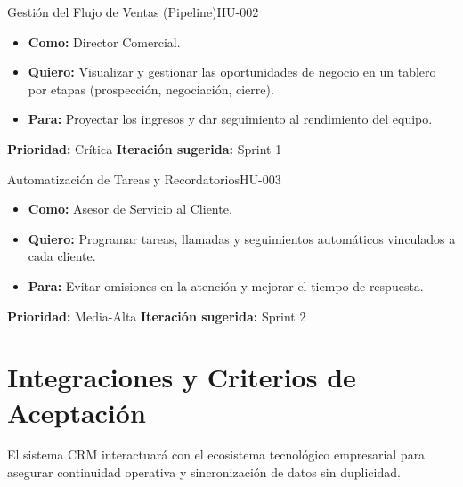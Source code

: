 \documentclass[11pt,a4paper]{article}
\begin{document}
\begin{UserStoryBox}{Gestión del Flujo de Ventas (Pipeline)}{HU-002}
    \sffamily
    \begin{itemize}[label=\textcolor{SecondarySteel}{\textbullet}]
        \item \textbf{Como:} Director Comercial.
        \item \textbf{Quiero:} Visualizar y gestionar las oportunidades de negocio en un tablero por etapas (prospección, negociación, cierre).
        \item \textbf{Para:} Proyectar los ingresos y dar seguimiento al rendimiento del equipo.
    \end{itemize}
    \tcblower
    \small\textcolor{MutedText}{\textbf{Prioridad:} Crítica \hfill \textbf{Iteración sugerida:} Sprint 1}
\end{UserStoryBox}

\begin{UserStoryBox}{Automatización de Tareas y Recordatorios}{HU-003}
    \sffamily
    \begin{itemize}[label=\textcolor{SecondarySteel}{\textbullet}]
        \item \textbf{Como:} Asesor de Servicio al Cliente.
        \item \textbf{Quiero:} Programar tareas, llamadas y seguimientos automáticos vinculados a cada cliente.
        \item \textbf{Para:} Evitar omisiones en la atención y mejorar el tiempo de respuesta.
    \end{itemize}
    \tcblower
    \small\textcolor{MutedText}{\textbf{Prioridad:} Media-Alta \hfill \textbf{Iteración sugerida:} Sprint 2}
\end{UserStoryBox}

\section{Integraciones y Criterios de Aceptación}

El sistema CRM interactuará con el ecosistema tecnológico empresarial para asegurar continuidad operativa y sincronización de datos sin duplicidad.
\end{document}
